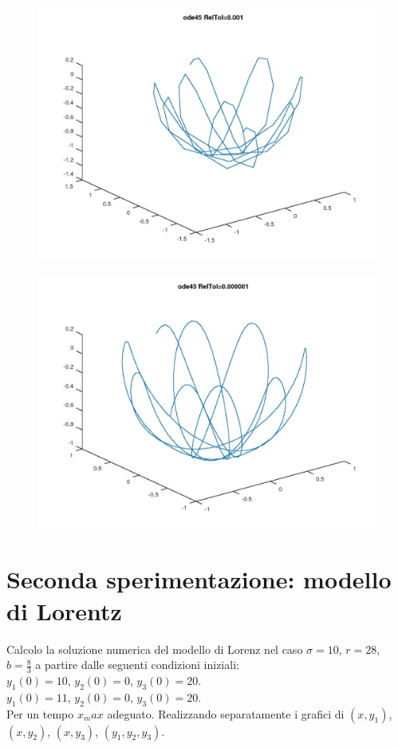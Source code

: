 \documentclass{article}
\begin{document}
	\begin{figure}[htp!]
		\centering 
		\includegraphics[width=\textwidth]{6_1_6.jpeg}
	\end{figure}
	\begin{figure}[htp!]
		\centering 
		\includegraphics[width=\textwidth]{6_1_7.jpeg}
	\end{figure}
	\newpage
	\section{Seconda sperimentazione: modello di Lorentz}
	Calcolo la soluzione numerica del modello di Lorenz nel caso $\sigma = 10$, $r = 28$, $b = \frac{8}{3}$ a partire dalle seguenti condizioni iniziali:\\
	$y_1(0) = 10$, $y_2(0) = 0$, $y_3(0) = 20$.\\
	$y_1(0) = 11$, $y_2(0) = 0$, $y_3(0) = 20$.\\
	Per un tempo $x_max$ adeguato. Realizzando separatamente i grafici di $(x, y_1)$, $(x, y_2)$,
	$(x, y_3)$, $(y_1, y_2, y_3)$.
\end{document}

